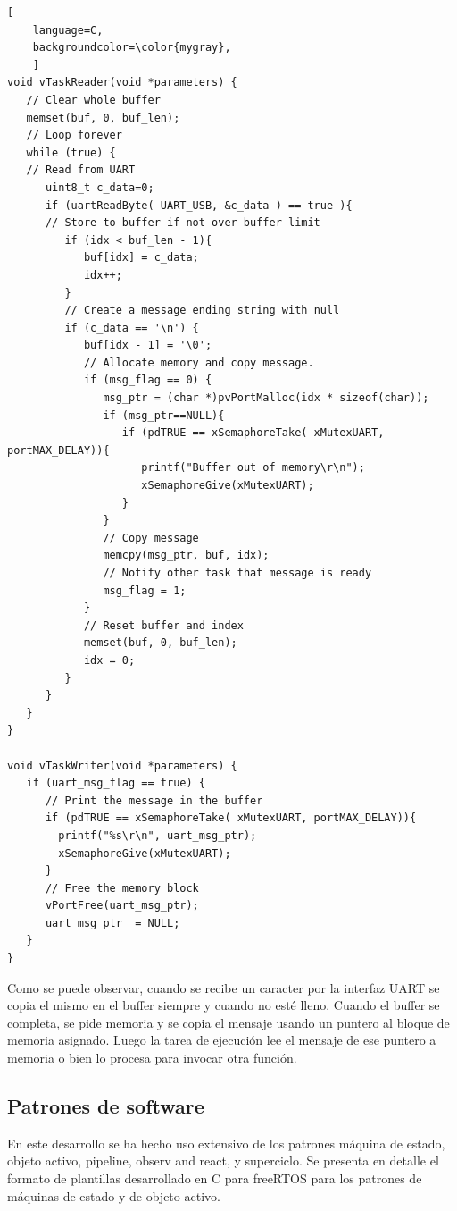 \begin{lstlisting}[
	language=C, 
	backgroundcolor=\color{mygray},
	]
void vTaskReader(void *parameters) {
   // Clear whole buffer
   memset(buf, 0, buf_len);
   // Loop forever
   while (true) {
   // Read from UART
      uint8_t c_data=0;
      if (uartReadByte( UART_USB, &c_data ) == true ){
      // Store to buffer if not over buffer limit  
         if (idx < buf_len - 1){
            buf[idx] = c_data;
            idx++;
         }
         // Create a message ending string with null
         if (c_data == '\n') {
            buf[idx - 1] = '\0';
            // Allocate memory and copy message. 
            if (msg_flag == 0) {
               msg_ptr = (char *)pvPortMalloc(idx * sizeof(char));
               if (msg_ptr==NULL){
                  if (pdTRUE == xSemaphoreTake( xMutexUART, portMAX_DELAY)){
                     printf("Buffer out of memory\r\n");
                     xSemaphoreGive(xMutexUART);
                  }
               }
               // Copy message
               memcpy(msg_ptr, buf, idx);
               // Notify other task that message is ready
               msg_flag = 1;
            }
            // Reset buffer and index
            memset(buf, 0, buf_len);
            idx = 0;
         }
      }
   }
}     

void vTaskWriter(void *parameters) {
   if (uart_msg_flag == true) {
      // Print the message in the buffer 
      if (pdTRUE == xSemaphoreTake( xMutexUART, portMAX_DELAY)){
        printf("%s\r\n", uart_msg_ptr);
        xSemaphoreGive(xMutexUART);
      }
      // Free the memory block  
      vPortFree(uart_msg_ptr);  
      uart_msg_ptr  = NULL;
   }
}

\end{lstlisting}

Como se puede observar, cuando se recibe un caracter por la interfaz UART se copia el mismo en el buffer siempre y cuando no esté lleno. Cuando el buffer se completa, se pide memoria y se copia el mensaje usando un puntero al bloque de memoria asignado. Luego la tarea de ejecución lee el mensaje de ese puntero a memoria o bien lo procesa para invocar otra función.\\


\subsection{Patrones de software}
En este desarrollo se ha hecho uso extensivo de los patrones máquina de estado, objeto activo, pipeline, observ and react, y superciclo. Se presenta en detalle el formato de plantillas desarrollado en C para freeRTOS para los patrones de máquinas de estado y de objeto activo. \\

